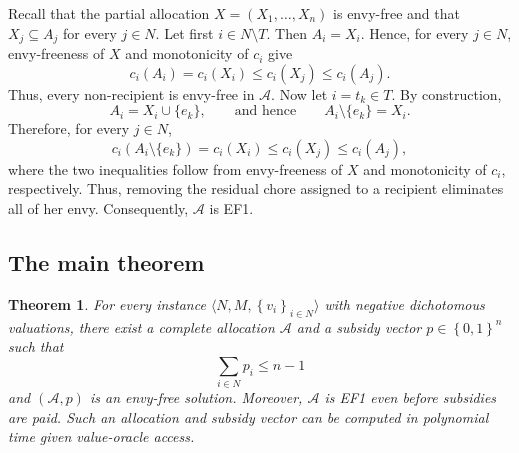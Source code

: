 \documentclass[11pt]{article}
\makeatletter
\theoremstyle{plain}
\newtheorem{theorem}{Theorem}
\theoremstyle{plain}
\renewenvironment{proof}[1][\proofname]{\par
  \pushQED{\qed}%
  \normalfont \topsep6\p@\@plus6\p@\relax
  \trivlist
  \item[\hskip\labelsep\bfseries #1\@addpunct{}]\ignorespaces
}{%
  \popQED\endtrivlist\@endpefalse
}
\newcommand{\agents}{N}                       %
\newcommand{\items}{M}                        %
\newcommand{\alloc}{\mathcal{A}}              %
\newcommand{\subsidy}{p}                      %
\newcommand{\set}[1]{\left\{#1\right\}}
\makeatother
\begin{document}
\begin{proof}
Recall that the partial allocation $X=(X_1,\ldots,X_n)$ is envy-free and that $X_j\subseteq A_j$ for every $j\in N$. Let first $i\in N\setminus T$. Then $A_i=X_i$. Hence, for every $j\in N$, envy-freeness of $X$ and monotonicity of $c_i$ give
\[
    c_i(A_i)
    =
    c_i(X_i)
    \leq
    c_i(X_j)
    \leq
    c_i(A_j).
\]
Thus, every non-recipient is envy-free in $\mathcal{A}$. Now let $i=t_k\in T$. By construction,
\[ A_i=X_i\cup\{e_k\},
    \qquad\text{and hence}\qquad
    A_i\setminus\{e_k\}=X_i.
\]
Therefore, for every $j\in N$,
\[c_i(A_i\setminus\{e_k\})
    =
    c_i(X_i)
    \leq
    c_i(X_j)
    \leq
    c_i(A_j),
\]
where the two inequalities follow from envy-freeness of $X$ and monotonicity of $c_i$, respectively. Thus, removing the residual chore assigned to a recipient eliminates all of her envy. Consequently, $\mathcal{A}$ is EF1.
\end{proof}%
\subsection{The main theorem}
\label{sec:m-main}




\begin{theorem}
\label{thm:m-main}
For every instance
$\langle \agents,\items,\set{v_i}_{i\in\agents}\rangle$ with negative dichotomous valuations, there exist a complete allocation $\alloc$ and a subsidy vector $\subsidy\in\set{0,1}^n$ such that
\[
    \sum_{i\in\agents}\subsidy_i\leq n-1
\]
and $(\alloc,\subsidy)$ is an envy-free solution. Moreover, $\alloc$ is EF1 even before subsidies are paid. Such an allocation and subsidy vector can be computed in polynomial time given value-oracle access.
\end{theorem}
\end{document}

